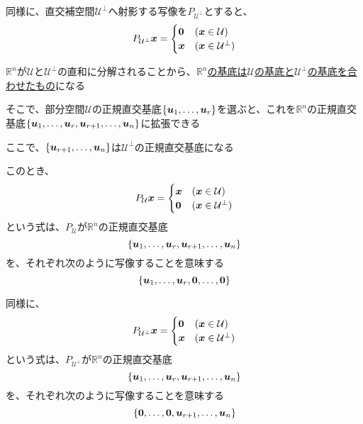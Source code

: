 \documentclass[../../../topic_linear-algebra]{subfiles}
\begin{document}
\br

同様に、直交補空間$\mathcal{U}^\perp$へ射影する写像を$P_{\mathcal{U}^\perp}$とすると、
\begin{equation*}
  P_{\mathcal{U}^{\perp}}\vb*{x} = \begin{cases}
    \vb*{0} & (\vb*{x} \in \mathcal{U})         \\
    \vb*{x} & (\vb*{x} \in \mathcal{U}^{\perp})
  \end{cases}
\end{equation*}

\sectionline

$\mathbb{R}^n$が$\mathcal{U}$と$\mathcal{U}^\perp$の直和に分解されることから、\hyperref[thm:direct-sum-and-basis]{$\mathbb{R}^n$の基底は$\mathcal{U}$の基底と$\mathcal{U}^\perp$の基底を合わせたもの}になる

\br

そこで、部分空間$\mathcal{U}$の正規直交基底$\{\vb*{u}_1, \ldots, \vb*{u}_r\}$を選ぶと、これを$\mathbb{R}^n$の正規直交基底$\{ \vb*{u}_1, \ldots, \vb*{u}_r, \vb*{u}_{r+1}, \ldots, \vb*{u}_n \}$に拡張できる

ここで、$\{ \vb*{u}_{r+1}, \ldots, \vb*{u}_n \}$は$\mathcal{U}^\perp$の正規直交基底になる

\br

このとき、
\begin{equation*}
  P_{\mathcal{U}}\vb*{x} = \begin{cases}
    \vb*{x} & (\vb*{x} \in \mathcal{U})         \\
    \vb*{0} & (\vb*{x} \in \mathcal{U}^{\perp})
  \end{cases}
\end{equation*}
という式は、$P_{\mathcal{U}}$が$\mathbb{R}^n$の正規直交基底
\begin{equation*}
  \{ \vb*{u}_1, \ldots, \vb*{u}_r, \vb*{u}_{r+1}, \ldots, \vb*{u}_n \}
\end{equation*}
を、それぞれ次のように写像することを意味する
\begin{equation*}
  \{ \vb*{u}_1, \ldots, \vb*{u}_r, \vb*{0}, \ldots, \vb*{0} \}
\end{equation*}

\br

同様に、
\begin{equation*}
  P_{\mathcal{U}^{\perp}}\vb*{x} = \begin{cases}
    \vb*{0} & (\vb*{x} \in \mathcal{U})         \\
    \vb*{x} & (\vb*{x} \in \mathcal{U}^{\perp})
  \end{cases}
\end{equation*}
という式は、$P_{\mathcal{U}^{\perp}}$が$\mathbb{R}^n$の正規直交基底
\begin{equation*}
  \{ \vb*{u}_1, \ldots, \vb*{u}_r, \vb*{u}_{r+1}, \ldots, \vb*{u}_n \}
\end{equation*}
を、それぞれ次のように写像することを意味する
\begin{equation*}
  \{ \vb*{0}, \ldots, \vb*{0}, \vb*{u}_{r+1}, \ldots, \vb*{u}_n \}
\end{equation*}
\end{document}
